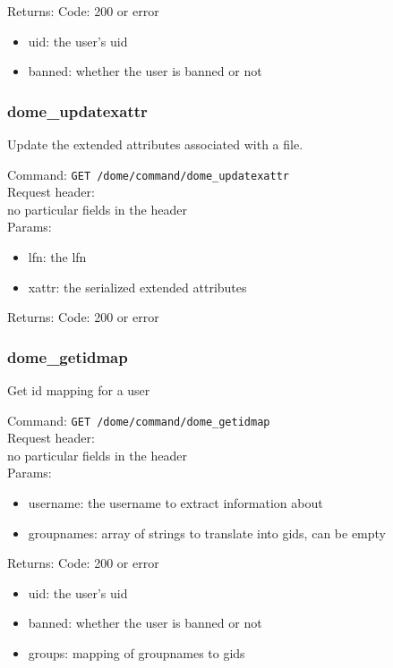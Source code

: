 \documentclass[a4paper,10pt]{scrreprt}
\begin{document}
Returns:
Code: 200 or error
\begin{itemize}
 \item uid: the user's uid
 \item banned: whether the user is banned or not
\end{itemize}

\subsubsection{dome\_updatexattr}

Update the extended attributes associated with a file.

Command:
\lstinline"GET /dome/command/dome_updatexattr"\\

Request header:\\
no particular fields in the header\\

Params:
\begin{itemize}
  \item lfn: the lfn
  \item xattr: the serialized extended attributes
\end{itemize}

Returns:
Code: 200 or error

\subsubsection{dome\_getidmap}

Get id mapping for a user

Command:
\lstinline"GET /dome/command/dome_getidmap"\\

Request header:\\
no particular fields in the header\\

Params:
\begin{itemize}
 \item username: the username to extract information about
 \item groupnames: array of strings to translate into gids, can be empty
\end{itemize}

Returns:
Code: 200 or error
\begin{itemize}
 \item uid: the user's uid
 \item banned: whether the user is banned or not
 \item groups: mapping of groupnames to gids
\end{itemize}
\end{document}
